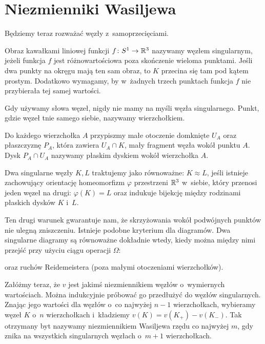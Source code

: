 \section{Niezmienniki Wasiljewa} %
\label{sec:vassiliev}
Będziemy teraz rozważać węzły z~samoprzecięciami.

\begin{definition}
	Obraz kawałkami liniowej funkcji $f \colon S^1 \to \mathbb R^3$ nazywamy węzłem singularnym, jeżeli funkcja $f$ jest różnowartościowa poza skończenie wieloma punktami.
	Jeśli dwa punkty na okręgu mają ten sam obraz, to $K$ przecina się tam pod kątem prostym.
	Dodatkowo wymagamy, by w~żadnych trzech punktach funkcja $f$ nie przybierała tej samej wartości.
\end{definition}

Gdy używamy słowa węzeł, nigdy nie mamy na myśli węzła singularnego.
Punkt, gdzie węzeł tnie samego siebie, nazywamy wierzchołkiem.

Do każdego wierzchołka $A$ przypiszmy małe otoczenie domknięte $U_A$ oraz płaszczyznę $P_A$, która zawiera $U_A \cap K$, mały fragment węzła wokół punktu $A$. Dysk $P_A \cap U_A$ nazywamy płaskim dyskiem wokół wierzchołka $A$.

\begin{definition}
	Dwa singularne węzły $K, L$ traktujemy jako równoważne: $K \approx L$, jeśli istnieje zachowujący orientację homeomorfizm $\varphi$ przestrzeni $\mathbb R^3$ w~siebie, który przenosi jeden węzeł na drugi: $\varphi(K) = L$ oraz indukuje bijekcję między rodzinami płaskich dysków $K$ i~$L$.
\end{definition}

Ten drugi warunek gwarantuje nam, że skrzyżowania wokół podwójnych punktów nie ulegną zniszczeniu.
Istnieje podobne kryterium dla diagramów.
Dwa singularne diagramy są równoważne dokładnie wtedy, kiedy można między nimi przejść przy użyciu ciągu operacji $\Omega$:


oraz ruchów Reidemeistera (poza małymi otoczeniami wierzchołków).

Załóżmy teraz, że $v$ jest jakimś niezmiennikiem węzłów o~wymiernych wartościach.
Można indukcyjnie próbować go przedłużyć do węzłów singularnych.
Znając jego wartości dla węzłów o~co najwyżej $n - 1$ wierzchołkach,  wybieramy węzeł $K$ o~$n$ wierzchołkach i~kładziemy $v(K) = v(K_+) - v(K_-)$.
Tak otrzymany byt nazywamy niezmiennikiem Wasiljewa rzędu co najwyżej $m$, gdy znika na wszystkich singularnych węzłach o~$m + 1$ wierzchołkach.

